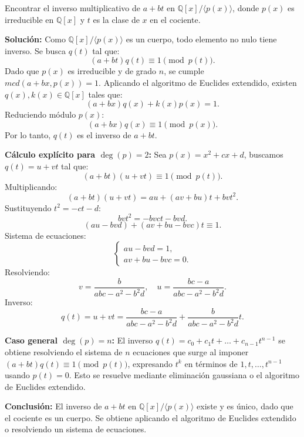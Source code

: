 Encontrar el inverso multiplicativo de \( a + b t \) en \( \mathbb{Q}[x] / \langle p(x) \rangle \), donde \( p(x) \) es irreducible en \( \mathbb{Q}[x] \) y \( t \) es la clase de \( x \) en el cociente.

\textbf{Solución:} Como \( \mathbb{Q}[x] / \langle p(x) \rangle \) es un cuerpo, todo elemento no nulo tiene inverso. Se busca \( q(t) \) tal que:
\[
(a + b t) q(t) \equiv 1 \pmod{p(t)}.
\]
Dado que \( p(x) \) es irreducible y de grado \( n \), se cumple \( mcd(a + b x, p(x)) = 1 \). Aplicando el algoritmo de Euclides extendido, existen \( q(x), k(x) \in \mathbb{Q}[x] \) tales que:
\[
(a + b x) q(x) + k(x) p(x) = 1.
\]
Reduciendo módulo \( p(x) \):
\[
(a + b x) q(x) \equiv 1 \pmod{p(x)}.
\]
Por lo tanto, \( q(t) \) es el inverso de \( a + b t \).

\textbf{Cálculo explícito para \( \deg(p) = 2 \):}  
Sea \( p(x) = x^2 + c x + d \), buscamos \( q(t) = u + v t \) tal que:
\[
(a + b t)(u + v t) \equiv 1 \pmod{p(t)}.
\]
Multiplicando:
\[
(a + b t)(u + v t) = a u + (a v + b u) t + b v t^2.
\]
Sustituyendo \( t^2 = -c t - d \):
\[
b v t^2 = -b v c t - b v d.
\]
\[
(a u - b v d) + (a v + b u - b v c) t \equiv 1.
\]
Sistema de ecuaciones:
\[
\begin{cases}
a u - b v d = 1, \\
a v + b u - b v c = 0.
\end{cases}
\]
Resolviendo:
\[
v = \frac{b}{a b c - a^2 - b^2 d}, \quad u = \frac{b c - a}{a b c - a^2 - b^2 d}.
\]
Inverso:
\[
q(t) = u + v t = \frac{b c - a}{a b c - a^2 - b^2 d} + \frac{b}{a b c - a^2 - b^2 d} t.
\]

\textbf{Caso general \( \deg(p) = n \):}  
El inverso \( q(t) = c_0 + c_1 t + \dots + c_{n-1} t^{n-1} \) se obtiene resolviendo el sistema de \( n \) ecuaciones que surge al imponer \( (a + b t) q(t) \equiv 1 \pmod{p(t)} \), expresando \( t^k \) en términos de \( 1, t, \dots, t^{n-1} \) usando \( p(t) = 0 \). Esto se resuelve mediante eliminación gaussiana o el algoritmo de Euclides extendido.

\textbf{Conclusión:}  
El inverso de \( a + b t \) en \( \mathbb{Q}[x]/\langle p(x) \rangle \) existe y es único, dado que el cociente es un cuerpo. Se obtiene aplicando el algoritmo de Euclides extendido o resolviendo un sistema de ecuaciones.

